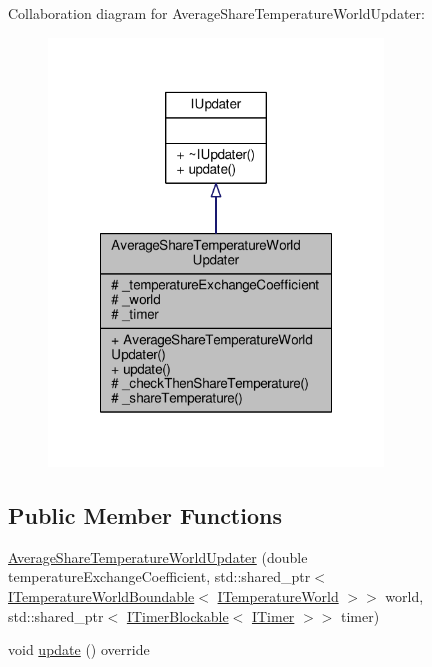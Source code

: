 Collaboration diagram for Average\-Share\-Temperature\-World\-Updater\-:
\nopagebreak
\begin{figure}[H]
\begin{center}
\leavevmode
\includegraphics[width=252pt]{class_average_share_temperature_world_updater__coll__graph}
\end{center}
\end{figure}
\subsection*{Public Member Functions}
\begin{DoxyCompactItemize}
\item 
\hyperlink{class_average_share_temperature_world_updater_a0031a5c20f9b717f0eb099f1d69e5ced}{Average\-Share\-Temperature\-World\-Updater} (double temperature\-Exchange\-Coefficient, std\-::shared\-\_\-ptr$<$ \hyperlink{class_i_temperature_world_boundable}{I\-Temperature\-World\-Boundable}$<$ \hyperlink{class_i_temperature_world}{I\-Temperature\-World} $>$$>$ world, std\-::shared\-\_\-ptr$<$ \hyperlink{class_i_timer_blockable}{I\-Timer\-Blockable}$<$ \hyperlink{class_i_timer}{I\-Timer} $>$$>$ timer)
\item 
void \hyperlink{class_average_share_temperature_world_updater_a29be9be2073572f3ef2dc5315c506245}{update} () override
\end{DoxyCompactItemize}
